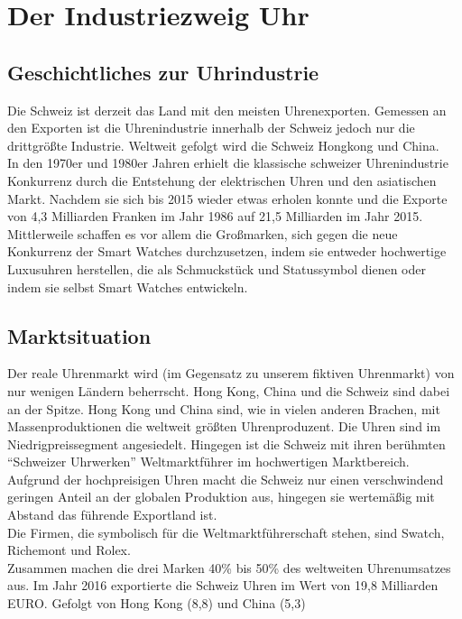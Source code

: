 \clearpage
\chapter{Der Industriezweig Uhr}
\section{Geschichtliches zur Uhrindustrie}
Die Schweiz ist derzeit das Land mit den meisten Uhrenexporten. Gemessen an den Exporten ist die Uhrenindustrie innerhalb der Schweiz jedoch nur die drittgrößte Industrie. Weltweit gefolgt wird die Schweiz Hongkong und China.\\ 
In den 1970er und 1980er Jahren erhielt die klassische schweizer Uhrenindustrie Konkurrenz durch die Entstehung der elektrischen Uhren und den asiatischen Markt. Nachdem sie sich bis 2015 wieder etwas erholen konnte und die Exporte von 4,3 Milliarden Franken im Jahr 1986 auf 21,5 Milliarden im Jahr 2015.\\ 
Mittlerweile schaffen es vor allem die Großmarken, sich gegen die neue Konkurrenz der Smart Watches durchzusetzen, indem sie entweder hochwertige Luxusuhren herstellen, die als Schmuckstück und Statussymbol dienen oder indem sie selbst Smart Watches entwickeln.

\section{Marktsituation}
Der reale Uhrenmarkt wird (im Gegensatz zu unserem fiktiven Uhrenmarkt) von nur wenigen Ländern beherrscht. Hong Kong, China und die Schweiz sind dabei an der Spitze. Hong Kong und China sind, wie in vielen anderen Brachen, mit Massenproduktionen die weltweit größten Uhrenproduzent. Die Uhren sind im Niedrigpreissegment angesiedelt. Hingegen ist die Schweiz mit ihren berühmten \enquote{Schweizer Uhrwerken} Weltmarktführer im hochwertigen Marktbereich. Aufgrund der hochpreisigen Uhren macht die Schweiz nur einen verschwindend geringen Anteil an der globalen Produktion aus, hingegen sie wertemäßig mit Abstand das führende Exportland ist. \\   
Die Firmen, die symbolisch für die Weltmarktführerschaft stehen, sind Swatch, Richemont und Rolex.\\
Zusammen machen die drei Marken 40\% bis 50\% des weltweiten Uhrenumsatzes aus. Im Jahr 2016 exportierte die Schweiz Uhren im Wert von 19,8 Milliarden EURO. Gefolgt von Hong Kong (8,8) und China (5,3)


